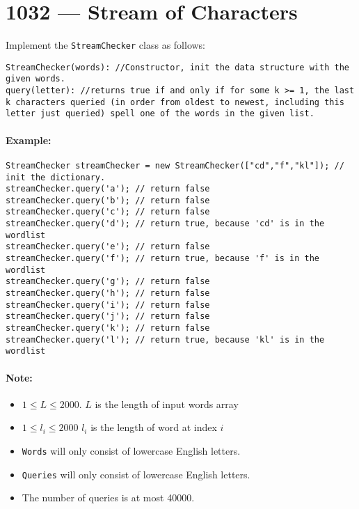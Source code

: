 \section{1032 --- Stream of Characters}
Implement the \texttt{StreamChecker} class as follows:

\begin{lstlisting}[style=customc]
StreamChecker(words): //Constructor, init the data structure with the given words.
query(letter): //returns true if and only if for some k >= 1, the last k characters queried (in order from oldest to newest, including this letter just queried) spell one of the words in the given list.
\end{lstlisting}
 

\paragraph{Example:}

\begin{lstlisting}[style=customc]
StreamChecker streamChecker = new StreamChecker(["cd","f","kl"]); // init the dictionary.
streamChecker.query('a'); // return false
streamChecker.query('b'); // return false
streamChecker.query('c'); // return false
streamChecker.query('d'); // return true, because 'cd' is in the wordlist
streamChecker.query('e'); // return false
streamChecker.query('f'); // return true, because 'f' is in the wordlist
streamChecker.query('g'); // return false
streamChecker.query('h'); // return false
streamChecker.query('i'); // return false
streamChecker.query('j'); // return false
streamChecker.query('k'); // return false
streamChecker.query('l'); // return true, because 'kl' is in the wordlist
\end{lstlisting}
 

\paragraph{Note:}

\begin{itemize}
\item $1 \leq L \leq 2000$. $L$ is the length of input words array
\item $1 \leq l_i \leq 2000$ $l_i$ is the length of word at index $i$
\item \texttt{Words} will only consist of lowercase English letters.
\item \texttt{Queries} will only consist of lowercase English letters.
\item The number of queries is at most 40000.
\end{itemize}